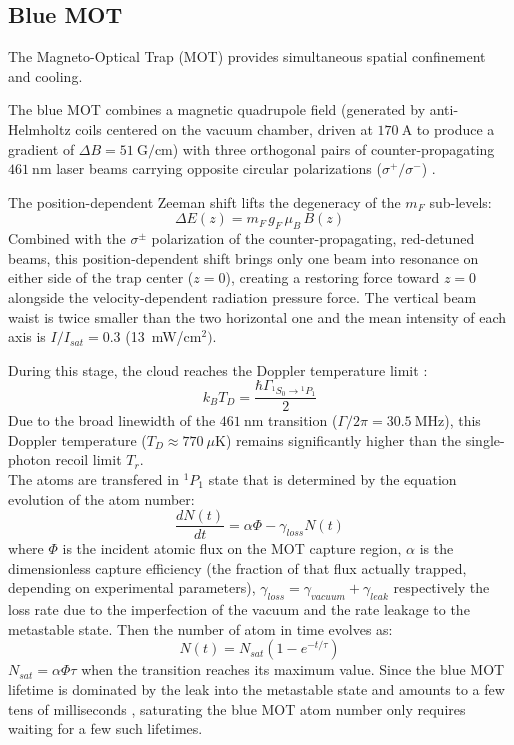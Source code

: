 \subsection{Blue MOT}

The Magneto-Optical Trap (MOT) provides simultaneous spatial confinement and cooling. 

The blue MOT combines a magnetic quadrupole field (generated by anti-Helmholtz coils
centered on the vacuum chamber, driven at $170~\text{A}$ to produce a gradient of
$\Delta B = 51~\text{G/cm}$) with three orthogonal pairs of counter-propagating
$461~\text{nm}$ laser beams carrying opposite circular polarizations ($\sigma^+/\sigma^-$)
\cite{phillips_laser_1998}.

The position-dependent Zeeman shift lifts the degeneracy of the $m_F$ sub-levels:
\begin{equation}
\Delta E(z) = m_F\, g_F\, \mu_B\, B(z)
\end{equation}
Combined with the $\sigma^\pm$ polarization of the counter-propagating, red-detuned
beams, this position-dependent shift brings only one beam into resonance on either
side of the trap center ($z=0$), creating a restoring force toward $z=0$ alongside
the velocity-dependent radiation pressure force.
The vertical beam waist is twice smaller than the two horizontal one and the mean intensity 
of each axis is $I/I_{sat} = 0.3$ (13~mW/cm$^2)$.

During this stage, the cloud reaches the Doppler temperature limit \cite{dalibard_atomes_froids}:
\begin{equation}
k_B T_D = \frac{\hbar \Gamma_{^1S_0 \rightarrow {}^1P_1}}{2}
\end{equation}
Due to the broad linewidth of the $461~\text{nm}$ transition ($\Gamma/2\pi = 30.5~\text{MHz}$), this Doppler temperature ($T_D \approx 770~\mu\text{K}$) remains significantly higher than the single-photon recoil limit $T_r$.\\
The atoms are transfered in $^1P_1$ state that is determined by the equation evolution of the atom number:
\begin{equation}
    \frac{dN(t)}{dt} = \alpha \Phi -\gamma_{loss}N(t)
\end{equation}
where $\Phi$ is the incident atomic flux on the MOT capture region, $\alpha$ is the dimensionless capture efficiency (the fraction of that flux actually trapped, depending on experimental parameters), $\gamma_{loss} = \gamma_{vacuum} + \gamma_{leak}$ respectively the loss rate due to the imperfection of the vacuum and the rate leakage to the
metastable state. Then the number of atom in time evolves as:
\begin{equation}
    N(t) = N_{sat}(1-e^{-t/\tau})
\end{equation}
$N_{sat} = \alpha \Phi \tau$ when the transition reaches its maximum value. Since the blue MOT lifetime is dominated by the leak into the metastable state and amounts to a few tens of milliseconds \cite{stellmer_creation_2012}, saturating the blue MOT atom number only requires waiting for a few such lifetimes. \\

